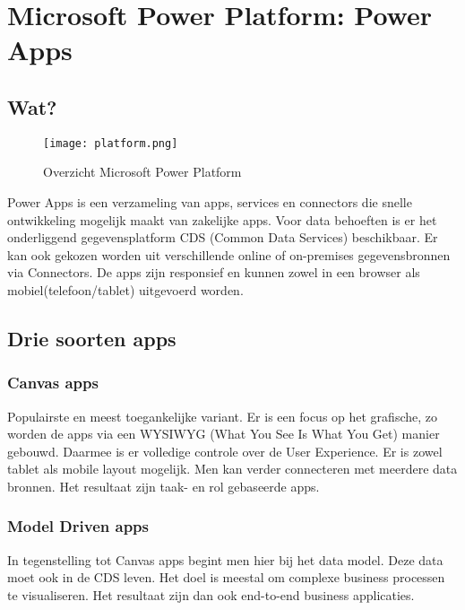 \section{Microsoft Power Platform: Power Apps}
\label{sec:power-platform}

\subsection{Wat?}

\begin{figure}[h!]
    \texttt{[image: platform.png]}
    \caption{Overzicht Microsoft Power Platform \autocite{MicrosoftDocs2019a}}
    \label{fig:mspowerplatform}
\end{figure}

Power Apps is een verzameling van apps, services en connectors die snelle ontwikkeling mogelijk maakt van zakelijke apps. Voor data behoeften is er het onderliggend gegevensplatform CDS (Common Data Services) beschikbaar. Er kan ook gekozen worden uit verschillende online of on-premises gegevensbronnen via Connectors. De apps zijn responsief en kunnen zowel in een browser als mobiel(telefoon/tablet) uitgevoerd worden. \autocite{MicrosoftDocs2019}

\subsection{Drie soorten apps}

\subsubsection{Canvas apps}

Populairste en meest toegankelijke variant. Er is een focus op het grafische, zo worden de apps via een WYSIWYG (What You See Is What You Get) manier gebouwd. Daarmee is er volledige controle over de User Experience. Er is zowel tablet als mobile layout mogelijk. Men kan verder connecteren met meerdere data bronnen. Het resultaat zijn taak- en rol gebaseerde apps. \autocite{PragmaticWorks2019}

\subsubsection{Model Driven apps}

In tegenstelling tot Canvas apps begint men hier bij het data model. Deze data moet ook in de CDS leven. Het doel is meestal om complexe business processen te visualiseren. Het resultaat zijn dan ook end-to-end business applicaties. \autocite{PragmaticWorks2019}

